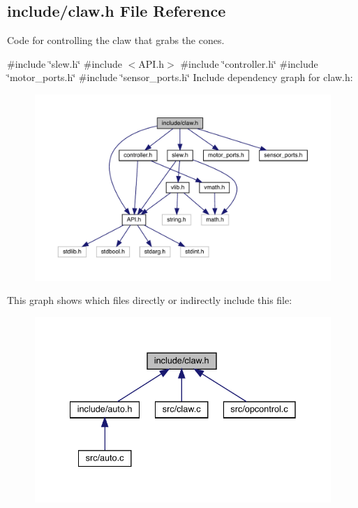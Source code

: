 \subsection{include/claw.h File Reference}
\label{claw_8h}


Code for controlling the claw that grabs the cones.  


{\ttfamily \#include \char`\"{}slew.\+h\char`\"{}}\newline
{\ttfamily \#include $<$A\+P\+I.\+h$>$}\newline
{\ttfamily \#include \char`\"{}controller.\+h\char`\"{}}\newline
{\ttfamily \#include \char`\"{}motor\+\_\+ports.\+h\char`\"{}}\newline
{\ttfamily \#include \char`\"{}sensor\+\_\+ports.\+h\char`\"{}}\newline
Include dependency graph for claw.\+h\+:\nopagebreak
\begin{figure}[H]
\begin{center}
\leavevmode
\includegraphics[width=350pt]{claw_8h__incl}
\end{center}
\end{figure}
This graph shows which files directly or indirectly include this file\+:\nopagebreak
\begin{figure}[H]
\begin{center}
\leavevmode
\includegraphics[width=335pt]{claw_8h__dep__incl}
\end{center}
\end{figure}
